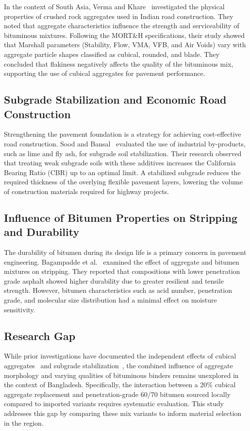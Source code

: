\documentclass[12pt,a4paper]{article}
\begin{document}
In the context of South Asia, Verma and Khare~\cite{verma2024study} investigated the physical properties of crushed rock aggregates used in Indian road construction. They noted that aggregate characteristics influence the strength and serviceability of bituminous mixtures. Following the MORT\&H specifications, their study showed that Marshall parameters (Stability, Flow, VMA, VFB, and Air Voids) vary with aggregate particle shapes classified as cubical, rounded, and blade. They concluded that flakiness negatively affects the quality of the bituminous mix, supporting the use of cubical aggregates for pavement performance.

\subsection{Subgrade Stabilization and Economic Road Construction}
Strengthening the pavement foundation is a strategy for achieving cost-effective road construction. Sood and Bansal~\cite{sood2015evaluation} evaluated the use of industrial by-products, such as lime and fly ash, for subgrade soil stabilization. Their research observed that treating weak subgrade soils with these additives increases the California Bearing Ratio (CBR) up to an optimal limit. A stabilized subgrade reduces the required thickness of the overlying flexible pavement layers, lowering the volume of construction materials required for highway projects.

\subsection{Influence of Bitumen Properties on Stripping and Durability}
The durability of bitumen during its design life is a primary concern in pavement engineering. Bagampadde et al.~\cite{bagampadde2006impact} examined the effect of aggregate and bitumen mixtures on stripping. They reported that compositions with lower penetration grade asphalt showed higher durability due to greater resilient and tensile strength. However, bitumen characteristics such as acid number, penetration grade, and molecular size distribution had a minimal effect on moisture sensitivity.

\subsection{Research Gap}
While prior investigations have documented the independent effects of cubical aggregates~\cite{teja2020effect, sumanth2017study} and subgrade stabilization~\cite{sood2015evaluation}, the combined influence of aggregate morphology and varying qualities of bituminous binders remains unexplored in the context of Bangladesh. Specifically, the interaction between a 20\% cubical aggregate replacement and penetration-grade 60/70 bitumen sourced locally compared to imported variants requires systematic evaluation. This study addresses this gap by comparing these mix variants to inform material selection in the region.
\end{document}
